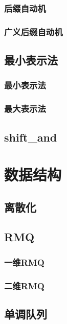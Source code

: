 \documentclass[a4paper,twocolumn]{article}
\begin{document}
\subsubsection{后缀自动机}

\subsubsection{广义后缀自动机}

\subsection{最小表示法}
\subsubsection{最小表示法}

\subsubsection{最大表示法}

\subsection{shift\_and}

\section{数据结构}
\subsection{离散化}

\subsection{RMQ}
\subsubsection{一维RMQ}

\subsubsection{二维RMQ}

\subsection{单调队列}

\end{document}
